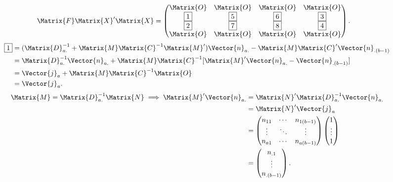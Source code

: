 \begin{align*}
    \Matrix{F}\Matrix{X}'\Matrix{X}
     & =\begin{pmatrix}
            \Matrix{O} & \Matrix{O} & \Matrix{O} & \Matrix{O} \\
            \boxed{1}  & \boxed{5}  & \boxed{6}  & \boxed{3}  \\
            \boxed{2}  & \boxed{7}  & \boxed{8}  & \boxed{4}  \\
            \Matrix{O} & \Matrix{O} & \Matrix{O} & \Matrix{O}
        \end{pmatrix}.
\end{align*}
\begin{align*}
    \boxed{1}
     & =(\Matrix{D}_{a.}^{-1}+\Matrix{M}\Matrix{C}^{-1}\Matrix{M}')\Vector{n}_{a.}-\Matrix{M}\Matrix{C}'\Vector{n}_{.(b-1)} \\
     & =\Matrix{D}_{a.}^{-1}\Vector{n}_{a.}+\Matrix{M}\Matrix{C}^{-1}[\Matrix{M}'\Vector{n}_{a.}-\Vector{n}_{.(b-1)}]       \\
     & =\Vector{j}_a+\Matrix{M}\Matrix{C}^{-1}\Matrix{O}                                                                    \\
     & =\Vector{j}_a.
\end{align*}
\begin{align*}
    \Matrix{M}
    =\Matrix{D}_{a.}^{-1}\Matrix{N}
    \implies \Matrix{M}'\Vector{n}_{a.} & =\Matrix{N}'\Matrix{D}_{a.}^{-1}\Vector{n}_{a.} \\
                                        & =\Matrix{N}'\Vector{j}_a                        \\
                                        & =\begin{pmatrix}
                                               n_{11} & \cdots & n_{1(b-1)} \\
                                               \vdots & \ddots & \vdots     \\
                                               n_{a1} & \cdots & n_{a(b-1)}
                                           \end{pmatrix}\begin{pmatrix}
                                                            1      \\
                                                            \vdots \\
                                                            1
                                                        \end{pmatrix}                   \\
                                        & =\begin{pmatrix}
                                               n_{.1} \\
                                               \vdots \\
                                               n_{.(b-1)}
                                           \end{pmatrix}.
\end{align*}

